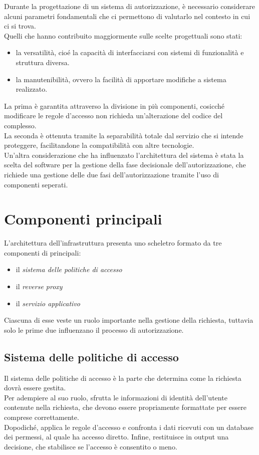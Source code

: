 Durante la progettazione di un sistema di autorizzazione, è necessario considerare alcuni parametri fondamentali
 che ci permettono di valutarlo 
nel contesto in cui ci si trova.
\\ Quelli che hanno contribuito maggiormente sulle scelte progettuali sono stati:
\begin{itemize}
    \item la versatilità, cioé la capacità di interfacciarsi con sistemi di 
    funzionalità e struttura diversa.
    \item la manutenibilità, ovvero la facilità di apportare modifiche a sistema realizzato.
\end{itemize}
La prima è garantita attraverso la divisione in più componenti, cosicché modificare le regole d'accesso non richieda
un'alterazione del codice del complesso. 
\\ La seconda è ottenuta tramite la separabilità totale dal servizio che si intende proteggere,
 facilitandone la compatibilità con altre tecnologie.  
\\ Un'altra considerazione che ha influenzato l'architettura del sistema è stata la scelta del software per la gestione 
della fase decisionale dell'autorizzazione, che richiede una gestione delle due fasi dell'autorizzazione tramite l'uso di componenti seperati. 

\section{Componenti principali}

L'architettura dell'infrastruttura presenta uno scheletro formato da tre componenti di principali: 
\begin{itemize}
    \item il \textit{sistema delle politiche di accesso}
    \item il \textit{reverse proxy}
    \item il \textit{servizio applicativo}
\end{itemize}
Ciascuna di esse veste un ruolo importante nella gestione della richiesta, tuttavia solo le prime due influenzano il processo di autorizzazione. 

\subsection{Sistema delle politiche di accesso}
Il sistema delle politiche di accesso è la parte che determina come la richiesta dovrà essere gestita. 
\\ Per adempiere al suo ruolo, sfrutta le informazioni di identità dell'utente contenute nella richiesta, 
che devono essere propriamente formattate per essere comprese correttamente. 
\\ Dopodiché, applica le regole d'accesso e confronta i dati ricevuti con un database dei permessi, al quale ha accesso diretto.
Infine, restituisce in output una decisione, che stabilisce se l'accesso è consentito o meno.  

